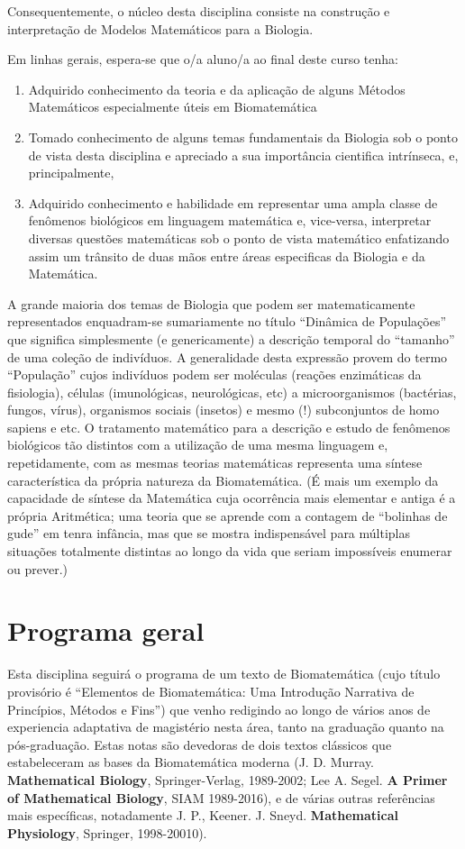 Consequentemente, o núcleo desta disciplina consiste na construção e interpretação de Modelos Matemáticos para a Biologia.

Em linhas gerais, espera-se que o/a aluno/a ao final deste curso tenha:
\begin{enumerate}
\item Adquirido conhecimento da teoria e da aplicação de alguns Métodos Matemáticos especialmente úteis em Biomatemática
\item Tomado conhecimento de alguns temas fundamentais da Biologia sob o ponto de vista desta disciplina e apreciado a sua importância cientifica intrínseca, e, principalmente,
\item Adquirido conhecimento e habilidade em representar uma ampla classe de fenômenos biológicos em linguagem matemática e, vice-versa, interpretar diversas questões matemáticas sob o ponto de vista matemático enfatizando assim um trânsito de duas mãos entre áreas especificas da Biologia e da Matemática.
\end{enumerate}

A grande maioria dos temas de Biologia que podem ser matematicamente representados enquadram-se sumariamente no título ``Dinâmica de Populações'' que significa simplesmente (e genericamente) a descrição temporal do “tamanho” de uma coleção de indivíduos. A generalidade desta expressão provem do termo ``População'' cujos indivíduos podem ser moléculas (reações enzimáticas da fisiologia), células (imunológicas, neurológicas, etc) a microorganismos (bactérias, fungos, vírus), organismos sociais (insetos) e mesmo (!) subconjuntos de homo sapiens e etc. O tratamento matemático para a descrição e estudo de fenômenos biológicos tão distintos com a utilização de uma mesma linguagem e, repetidamente, com as mesmas teorias matemáticas representa uma síntese característica da própria natureza da Biomatemática. (É mais um exemplo da capacidade de síntese da Matemática cuja ocorrência mais elementar e antiga é a própria Aritmética; uma teoria que se aprende com a contagem de ``bolinhas de gude'' em tenra infância, mas que se mostra indispensável para múltiplas situações totalmente distintas ao longo da vida que seriam impossíveis enumerar ou prever.)

\section{Programa geral}

Esta disciplina seguirá o programa de um texto de Biomatemática (cujo título provisório é ``Elementos de Biomatemática: Uma Introdução Narrativa de Princípios, Métodos e Fins'') que venho redigindo ao longo de vários anos de experiencia adaptativa de magistério nesta área, tanto na graduação quanto na pós-graduação. Estas notas são devedoras de dois textos clássicos que estabeleceram as bases da Biomatemática moderna (J. D. Murray. \textbf{Mathematical Biology}, Springer-Verlag, 1989-2002; Lee A. Segel. \textbf{A Primer of Mathematical Biology}, SIAM 1989-2016), e de várias outras referências mais específicas, notadamente J. P., Keener. J. Sneyd. \textbf{Mathematical Physiology}, Springer, 1998-20010). 

